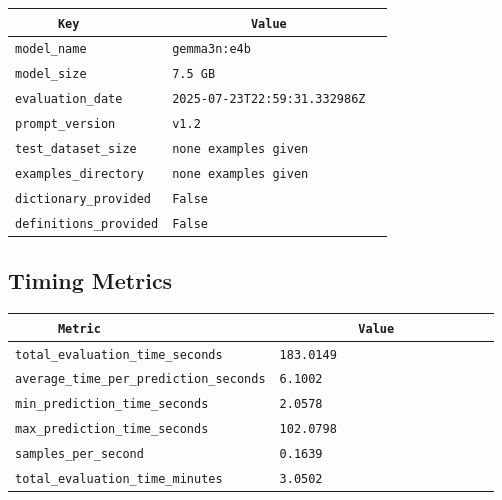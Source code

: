 \documentclass{article}
\begin{document}
\begin{center}
\begin{tabular}{l | l} \hline
    \verb|      Key      | & \verb|           Value           | \\ \hline
    \hline
    \verb|model_name    | & \verb|gemma3n:e4b                  | \\ \hline
    \verb|model_size    | & \verb|7.5 GB                       | \\ \hline
    \verb|evaluation_date| & \verb|2025-07-23T22:59:31.332986Z  | \\ \hline
    \verb|prompt_version| & \verb|v1.2                         | \\ \hline
    \verb|test_dataset_size| & \verb|none examples given          | \\ \hline
    \verb|examples_directory| & \verb|none examples given          | \\ \hline
    \verb|dictionary_provided| & \verb|False                        | \\ \hline
    \verb|definitions_provided| & \verb|False                        | \\ \hline
\end{tabular}
\end{center}

\subsection{Timing Metrics}

\begin{center}
\begin{tabular}{l | l} \hline
    \verb|      Metric     | & \verb|           Value           | \\ \hline
    \hline
    \verb|total_evaluation_time_seconds| & \verb|183.0149                     | \\ \hline
    \verb|average_time_per_prediction_seconds| & \verb|6.1002                       | \\ \hline
    \verb|min_prediction_time_seconds| & \verb|2.0578                       | \\ \hline
    \verb|max_prediction_time_seconds| & \verb|102.0798                     | \\ \hline
    \verb|samples_per_second| & \verb|0.1639                       | \\ \hline
    \verb|total_evaluation_time_minutes| & \verb|3.0502                       | \\ \hline
\end{tabular}
\end{center}
\end{document}
